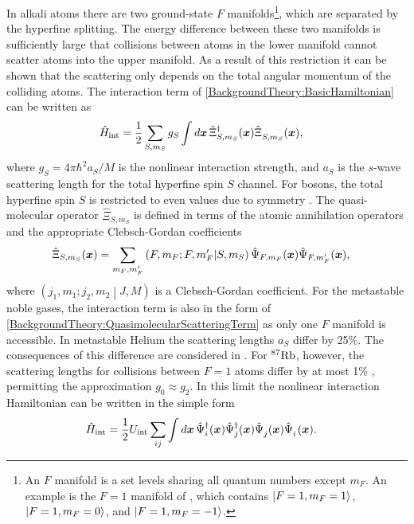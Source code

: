 In alkali atoms there are two ground-state $F$ manifolds\footnote{An $F$ manifold is a set levels sharing all quantum numbers except $m_F$.  An example is the $F=1$ manifold of , which contains ${\left|F=1, m_F=1\right>}$, ${\left|F=1, m_F=0\right>}$, and ${\left|F=1, m_F=-1\right>}$.}, which are separated by the hyperfine splitting.  The energy difference between these two manifolds is sufficiently large that collisions between atoms in the lower manifold cannot scatter atoms into the upper manifold.  As a result of this restriction it can be shown \citep{Ho:1998} that the scattering only depends on the total angular momentum of the colliding atoms.  The interaction term of \eqref{BackgroundTheory:BasicHamiltonian} can be written as
\begin{align}
    \label{BackgroundTheory:QuasimolecularScatteringTerm}
    \hat{H}_\text{int} &= \frac{1}{2}\sum_{S, m_S}  g_S \int d \vect{x}\, \hat{\Xi}^\dagger_{S, m_S}(\vect{x}) \hat{\Xi}^{\phantom{\dagger}}_{S, m_S}(\vect{x}),
\end{align}
where $g_S = 4 \pi \hbar^2 a_S/M$ is the nonlinear interaction strength, and $a_S$ is the $s$-wave scattering length for the total hyperfine spin $S$ channel.  For bosons, the total hyperfine spin $S$ is restricted to even values due to symmetry \citep{Ho:1998}.  The quasi-molecular operator $\hat{\Xi}_{S, m_S}$ is defined in terms of the atomic annihilation operators and the appropriate Clebsch-Gordan coefficients
\begin{align}
    \hat{\Xi}_{S, m_S}(\bm{x}) &= \sum_{m_F, m_F'} \left(F, m_F; F, m_F' \middle| S, m_S \right) \hat{\Psi}_{F, m_F}(\bm{x}) \hat{\Psi}_{F, m_F'}(\bm{x}),
\end{align}
where $\left(j_1, m_1; j_2, m_2 \middle| J, M\right)$ is a Clebsch-Gordan coefficient.  For the metastable noble gases, the interaction term is also in the form of \eqref{BackgroundTheory:QuasimolecularScatteringTerm} as only one $F$ manifold is accessible.  In metastable Helium the scattering lengths $a_S$ differ by 25\%.  The consequences of this difference are considered in .  For $^{87}\text{Rb}$, however, the scattering lengths for collisions between $F=1$ atoms differ by at most 1\% \citep{Kempen:2002}, permitting the approximation $g_0 \approx g_2$.  In this limit the nonlinear interaction Hamiltonian can be written in the simple form
\begin{align}
    \label{BackgroundTheory:SimpleScattering}
    \hat{H}_\text{int} &= \frac{1}{2} U_\text{int} \sum_{ij} \int d \vect{x}\, \hat{\Psi}_i^\dagger(\vect{x}) \hat{\Psi}_j^\dagger(\vect{x}) \hat{\Psi}_j^{\phantom{\dagger}}(\vect{x}) \hat{\Psi}_i^{\phantom{\dagger}}(\vect{x}).
\end{align}

